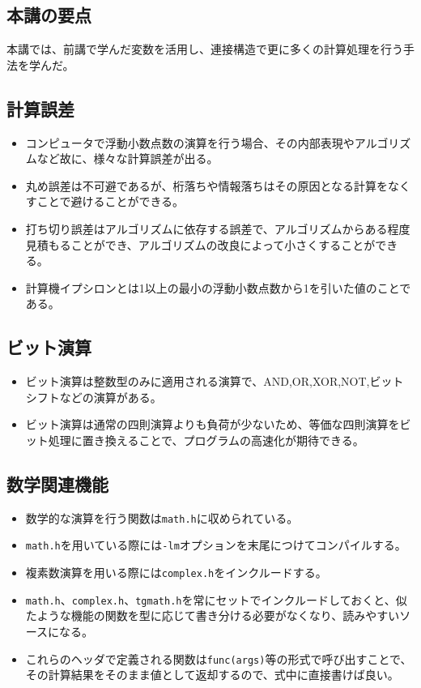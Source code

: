 \begin{shadebox}
\section*{本講の要点}
本講では、前講で学んだ変数を活用し、連接構造で更に多くの計算処理を行う手法を学んだ。
\subsection*{計算誤差}
\begin{itemize}
\item コンピュータで浮動小数点数の演算を行う場合、その内部表現やアルゴリズムなど故に、様々な計算誤差が出る。
\item 丸め誤差は不可避であるが、桁落ちや情報落ちはその原因となる計算をなくすことで避けることができる。
\item 打ち切り誤差はアルゴリズムに依存する誤差で、アルゴリズムからある程度見積もることができ、アルゴリズムの改良によって小さくすることができる。
\item 計算機イプシロンとは1以上の最小の浮動小数点数から1を引いた値のことである。
\end{itemize}

\subsection*{ビット演算}
\begin{itemize}
\item ビット演算は整数型のみに適用される演算で、AND,OR,XOR,NOT,ビットシフトなどの演算がある。
\item ビット演算は通常の四則演算よりも負荷が少ないため、等価な四則演算をビット処理に置き換えることで、プログラムの高速化が期待できる。
\end{itemize}

\subsection*{数学関連機能}
\begin{itemize}
\item 数学的な演算を行う関数は\verb|math.h|に収められている。
\item \verb|math.h|を用いている際には\verb|-lm|オプションを末尾につけてコンパイルする。
\item 複素数演算を用いる際には\verb|complex.h|をインクルードする。
\item \verb|math.h|、\verb|complex.h|、\verb|tgmath.h|を常にセットでインクルードしておくと、似たような機能の関数を型に応じて書き分ける必要がなくなり、読みやすいソースになる。
\item これらのヘッダで定義される関数は\verb|func(args)|等の形式で呼び出すことで、その計算結果をそのまま値として返却するので、式中に直接書けば良い。
\end{itemize}
\end{shadebox}
